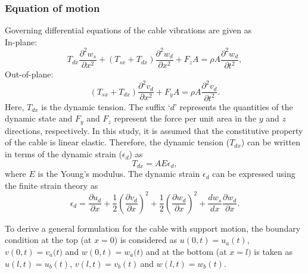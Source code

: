 \documentclass[review]{elsarticle}
\begin{document}
\subsubsection{Equation of motion}
Governing differential equations of the cable vibrations are given as \cite{Wagg_2009,Warnitchai_1995}\\
In-plane:
\begin{equation}    \label{GrindEQ__4_} 
T_{dx}\frac{{\partial }^2w_s}{\partial x^2}+\left(T_{sx}+T_{dx}\right)\frac{{\partial }^2w_d}{\partial x^2}+F_zA=\rho A\frac{{\partial }^2w_d}{\partial t^2},
\end{equation}
Out-of-plane:
\begin{equation}  \label{GrindEQ__5_} 
\left(T_{sx}+T_{dx}\right)\frac{{\partial }^2v_d}{\partial x^2}+F_yA=\rho A\frac{{\partial }^2v_d}{\partial t^2}.              
\end{equation}
Here, $T_{dx}$ is the dynamic tension. The suffix `$d$' represents the quantities of the dynamic state and $F_y$ and $F_z$ represent the force per unit area in the $y$ and $z$ directions, respectively. In this study, it is assumed that the constitutive property of the cable is linear elastic. Therefore, the dynamic tension ($T_{dx}$) can be written in terms of the dynamic strain (${\epsilon }_d$) as
\begin{equation} \label{GrindEQ__6_} 
T_{dx}=AE{\epsilon }_d,               
\end{equation} 
where $E$ is the Young's modulus. The dynamic strain  ${\epsilon }_d$ can be expressed using the finite strain theory as
\begin{equation} \label{GrindEQ__7_} 
{\epsilon }_d=\frac{\partial u_d}{\partial x}+\frac{1}{2}{\left(\frac{\partial v_d}{\partial x}\right)}^2+\frac{1}{2}{\left(\frac{\partial w_d}{\partial x}\right)}^2+\frac{dw_s}{dx}\frac{\partial w_d}{\partial x}. 
\end{equation} 

To derive a general formulation for the cable with support motion, the boundary condition at the top (at $x=0$) is considered as $u\left(0,t\right)=u_a(t)$, $v\left(0,t\right)=v_a(t{)}$ and $w\left(0,t\right)=w_a(t{)}$ and at the bottom (at $x=l)$ is taken as $u\left(l,t\right)=u_b(t)$, $v\left(l,t\right)=v_b(t)\ $and $w\left(l,t\right)=w_b(t)$.
\end{document}
